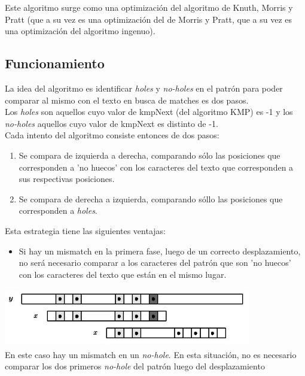 \documentclass[a4paper, 10pt]{article}
\newcommand\tab[1][0.5cm]{\hspace*{#1}}
\begin{document}
		\tab Este algoritmo surge como una optimización del algoritmo de Knuth, Morris y Pratt (que a su vez es una
   		optimización del de Morris y Pratt, que a su vez es una optimización del algoritmo ingenuo).
		
		\subsection{Funcionamiento}    		
    			La idea del algoritmo es identificar \emph{holes} y \emph{no-holes} en el patrón para poder comparar al mismo con el texto
    			en busca de matches es dos pasos. \\
    			\tab Los \emph{holes} son aquellos cuyo valor de kmpNext (del algoritmo KMP) es -1 y los \emph{no-holes} aquellos cuyo 
    			valor de kmpNext es distinto de -1. \\
    			\tab Cada intento del algoritmo consiste entonces de dos pasos:
    			\begin{enumerate}
    				\item Se compara de izquierda a derecha, comparando sólo las posiciones que corresponden a 'no huecos' con los
        			caracteres del texto que corresponden a sus respectivas posiciones.
        			\item Se compara de derecha a izquierda, comparando sóllo las posiciones que corresponden a \emph{holes}.
    			\end{enumerate}
			\tab Esta estrategia tiene las siguientes ventajas:
			\begin{itemize}
				\item Si hay un mismatch en la primera fase, luego de un correcto desplazamiento, no será necesario comparar a 
        			los caracteres del patrón que son 'no huecos' con los caracteres del texto que están en el mismo lugar.
        		\end{itemize}
        		\begin{center}
        			\includegraphics[width=4.25in, height=1in]{images/nohole}
        			\\ En este caso hay un mismatch en un \emph{no-hole}. En esta situación, no es necesario comparar los dos primeros
			    \emph{no-hole} del patrón luego del desplazamiento
		    \end{center}
\end{document}
